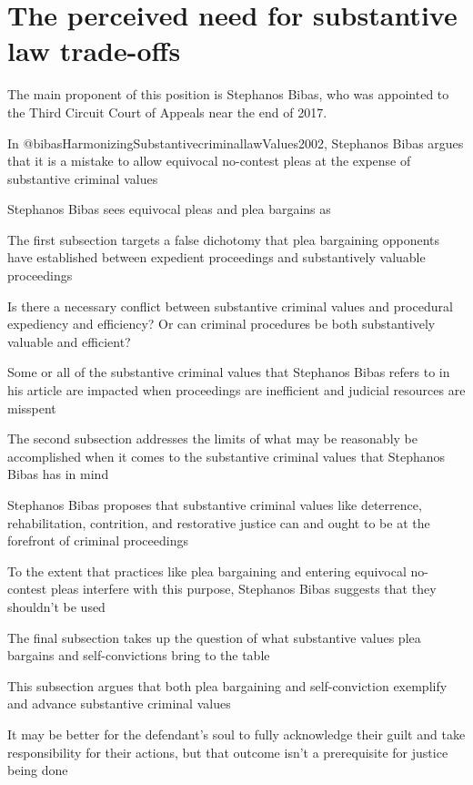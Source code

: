 \section{The perceived need for substantive law trade-offs}



The main proponent of this position is Stephanos Bibas, who was appointed to the Third Circuit Court of Appeals near the end of 2017.

In @bibasHarmonizingSubstantivecriminallawValues2002, Stephanos Bibas argues that it is a mistake to allow equivocal no-contest pleas at the expense of substantive criminal values

Stephanos Bibas sees equivocal pleas and plea bargains as

The first subsection targets a false dichotomy that plea bargaining opponents have established between expedient proceedings and substantively valuable proceedings

Is there a necessary conflict between substantive criminal values and procedural expediency and efficiency? Or can criminal procedures be both substantively valuable and efficient?

Some or all of the substantive criminal values that Stephanos Bibas refers to in his article are impacted when proceedings are inefficient and judicial resources are misspent

The second subsection addresses the limits of what may be reasonably be accomplished when it comes to the substantive criminal values that Stephanos Bibas has in mind

Stephanos Bibas proposes that substantive criminal values like deterrence, rehabilitation, contrition, and restorative justice can and ought to be at the forefront of criminal proceedings

To the extent that practices like plea bargaining and entering equivocal no-contest pleas interfere with this purpose, Stephanos Bibas suggests that they shouldn't be used

The final subsection takes up the question of what substantive values plea bargains and self-convictions bring to the table

This subsection argues that both plea bargaining and self-conviction exemplify and advance substantive criminal values

It may be better for the defendant's soul to fully acknowledge their guilt and take responsibility for their actions, but that outcome isn't a prerequisite for justice being done

